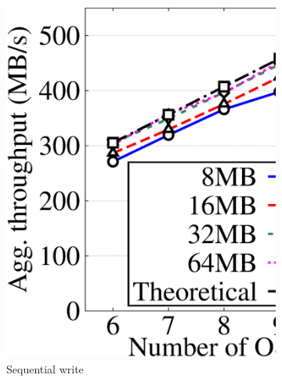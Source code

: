 \begin{figure}[!t]
\centering
 \begin{subfigure}{0.4\linewidth}
     \includegraphics[width=\linewidth]{charts/transfer/eps/up/rdp_6}
     \caption{Sequential write}
     \label{fig:rdp_write}
 \end{subfigure}
 \hspace{0.005\linewidth}
 \begin{subfigure}{0.4\linewidth}

\end{subfigure}
\end{figure}
